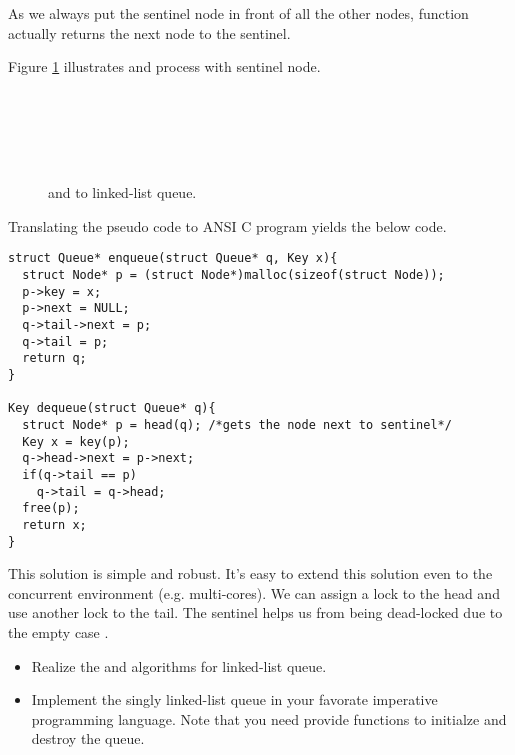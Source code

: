 \documentclass{article}
\begin{document}
As we always put the sentinel node in front of all the other nodes,
function  actually returns the next node to the sentinel.

Figure \ref{fig:list-queue} illustrates  and  process with sentinel node.

\begin{figure}[htbp]
 \centering
  \\
  \\
  \\
  \\
 \caption{ and  to linked-list queue.} \label{fig:list-queue}
\end{figure}

Translating the pseudo code to ANSI C program yields the below code.

\begin{lstlisting}
struct Queue* enqueue(struct Queue* q, Key x){
  struct Node* p = (struct Node*)malloc(sizeof(struct Node));
  p->key = x;
  p->next = NULL;
  q->tail->next = p;
  q->tail = p;
  return q;
}

Key dequeue(struct Queue* q){
  struct Node* p = head(q); /*gets the node next to sentinel*/
  Key x = key(p);
  q->head->next = p->next;
  if(q->tail == p)
    q->tail = q->head;
  free(p);
  return x;
}
\end{lstlisting}

This solution is simple and robust. It's easy to extend this solution 
even to the concurrent environment (e.g. multi-cores). We can assign
a lock to the head and use another lock to the tail. The sentinel 
helps us from being dead-locked due to the empty case \cite{PODC96} \cite{SutterDDJ}.

\begin{Exercise}
\begin{itemize}
\item Realize the  and  algorithms
for linked-list queue.

\item Implement the singly linked-list queue in your favorate imperative 
programming language. Note that you need provide functions to initialze
and destroy the queue.
\end{itemize}
\end{Exercise}
\end{document}
